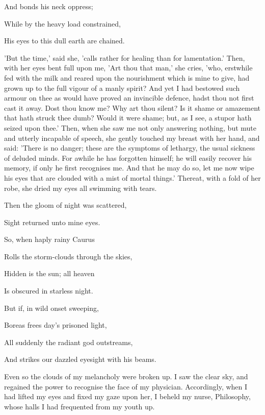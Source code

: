 And bonds his neck oppress;

While by the heavy load constrained,

His eyes to this dull earth are chained.


'But the time,' said she, 'calls rather for healing than for
lamentation.' Then, with her eyes bent full upon me, 'Art thou that
man,' she cries, 'who, erstwhile fed with the milk and reared upon the
nourishment which is mine to give, had grown up to the full vigour of a
manly spirit? And yet I had bestowed such armour on thee as would have
proved an invincible defence, hadst thou not first cast it away. Dost
thou know me? Why art thou silent? Is it shame or amazement that hath
struck thee dumb? Would it were shame; but, as I see, a stupor hath
seized upon thee.' Then, when she saw me not only answering nothing, but
mute and utterly incapable of speech, she gently touched my breast with
her hand, and said: 'There is no danger; these are the symptoms of
lethargy, the usual sickness of deluded minds. For awhile he has
forgotten himself; he will easily recover his memory, if only he first
recognises me. And that he may do so, let me now wipe his eyes that are
clouded with a mist of mortal things.' Thereat, with a fold of her robe,
she dried my eyes all swimming with tears.


Then the gloom of night was scattered,

Sight returned unto mine eyes.

So, when haply rainy Caurus

Rolls the storm-clouds through the skies,

Hidden is the sun; all heaven

Is obscured in starless night.

But if, in wild onset sweeping,

Boreas frees day's prisoned light,

All suddenly the radiant god outstreams,

And strikes our dazzled eyesight with his beams.


Even so the clouds of my melancholy were broken up. I saw the clear sky,
and regained the power to recognise the face of my physician.
Accordingly, when I had lifted my eyes and fixed my gaze upon her, I
beheld my nurse, Philosophy, whose halls I had frequented from my youth
up.

